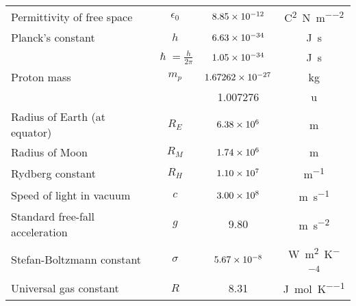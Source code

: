 \begin{longtable}{l c c c}
    Permittivity of free space & $\epsilon_0$ & $8.85\times 10^{-12}$ & \si{\coulomb\squared\per\newton\per\meter\squared} \\
    Planck's constant & $h$ & $6.63\times 10^{-34}$ & \si{\joule\second} \\
    & $\hslash=\frac{h}{2\pi}$ & $1.05\times 10^{-34}$ & \si{\joule\second} \\
    Proton mass & $m_p$ & $1.67262\times 10^{-27}$ & \si{\kilo\gram} \\
    && 1.007276 & \si{\atomicmassunit} \\
    Radius of Earth (at equator) & $R_E$ & $6.38\times 10^{6}$ & \si{\meter} \\
    Radius of Moon & $R_M$ & $1.74\times 10^{6}$ & \si{\meter} \\
    Rydberg constant & $R_H$ & $1.10\times 10^{7}$ & \si{\meter^{-1}} \\
    Speed of light in vacuum & $c$ & $3.00\times 10^{8}$ & \si{\meter\per\second} \\
    Standard free-fall acceleration & $g$ & 9.80 & \si{\meter\per\second\squared} \\
    Stefan-Boltzmann constant & $\sigma$ & $5.67\times 10^{-8}$ & \si{\watt\per\meter\squared\per\kelvin^4} \\
    Universal gas constant & $R$ & 8.31 & \si{\joule\per\mole\per\kelvin} \\
    \bottomrule
\end{longtable}


